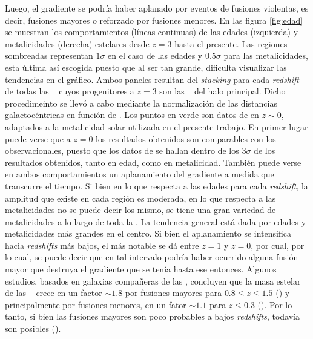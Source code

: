  Luego, el gradiente se podr\'ia haber aplanado
 por eventos de fusiones violentas, es decir, fusiones mayores o reforzado por fusiones menores.
 En las figura \ref{fig:edad} se muestran los comportamientos (l\'ineas continuas) de las edades (izquierda) y metalicidades
 (derecha) estelares desde $z=3$ hasta el presente.  Las regiones sombreadas representan $1\sigma$ en el caso
 de las edades y $0.5\sigma$ para las metalicidades, esta \'ultima as\'i escogida 
 puesto que al ser tan grande, dificulta visualizar las tendencias en el gr\'afico.
 Ambos paneles resultan del \textit{stacking} para cada \textit{redshift} de
 todas las \bcgs~ cuyos progenitores a $z=3$ son las \bcgs~ del halo principal. Dicho procedimeinto
 se llev\'o a cabo mediante la normalizaci\'on de
 las distancias galactoc\'entricas en funci\'on de \rvc. Los puntos
 en verde son datos de \cite{oli15} en $z \sim 0$, adaptados a la metalicidad solar utilizada
 en el presente trabajo.
 En primer lugar puede verse que a $z=0$ los resultados obtenidos son comparables con los observacionales,
 puesto que los datos de \cite{oli15} se hallan dentro de los $3\sigma$ de los resultados obtenidos, tanto en 
 edad, como en metalicidad. Tambi\'en puede verse en ambos comportamientos
 un aplanamiento del gradiente a medida que transcurre el tiempo. Si bien en lo que respecta a las edades
 para cada \textit{redshift}, la amplitud que existe en cada regi\'on es moderada, en lo 
 que respecta a las metalicidades no se puede decir los mismo, se tiene una gran variedad de metalicidades
 a lo largo de toda la \bcg. La tendencia general est\'a dada por edades y metalicidades
 m\'as grandes en el centro. Si bien el aplanamiento se intensifica hacia \textit{redshifts}
 m\'as bajos, el m\'as notable se d\'a
 entre $z=1$ y $z=0$, por cual, por lo cual, se puede decir que en tal intervalo podr\'ia haber ocurrido alguna fusi\'on
 mayor que destruya el gradiente que se ten\'ia hasta ese entonces. Algunos estudios, basados
 en galaxias compa\~neras de las \bcgs, concluyen que la masa estelar de las \bcgs~ crece
 en un factor $\sim 1.8$ por fusiones mayores para $ 0.8\le z \le 1.5$ (\cite{bur13})
 y principalmente por fusiones menores, en un fator $\sim 1.1$ para $z\le0.3$ (\cite{edw12}). Por lo tanto,
 si bien las fusiones mayores son poco probables a bajos \textit{redshifts}, todav\'ia
 son posibles (\cite{jim13}).
 


